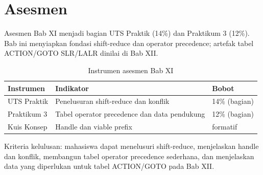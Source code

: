 \section*{Asesmen}

Asesmen Bab XI menjadi bagian UTS Praktik (14\%) dan Praktikum 3
(12\%). Bab ini menyiapkan fondasi shift-reduce dan operator
precedence; artefak tabel ACTION/GOTO SLR/LALR dinilai di Bab XII.

\begin{table}[H]
\centering
\caption{Instrumen asesmen Bab XI}
\label{tab:ch11-asesmen}
\begin{tabularx}{\textwidth}{@{}lXl@{}}
\toprule
\textbf{Instrumen} & \textbf{Indikator} & \textbf{Bobot} \\
\midrule
UTS Praktik & Penelusuran shift-reduce dan konflik & 14\% (bagian) \\
Praktikum 3 & Tabel operator precedence dan data pendukung &
12\% (bagian) \\
Kuis Konsep & Handle dan viable prefix & formatif \\
\bottomrule
\end{tabularx}
\end{table}

Kriteria kelulusan: mahasiswa dapat menelusuri shift-reduce,
menjelaskan handle dan konflik, membangun tabel operator precedence
sederhana, dan menjelaskan data yang diperlukan untuk tabel
ACTION/GOTO pada Bab XII.
